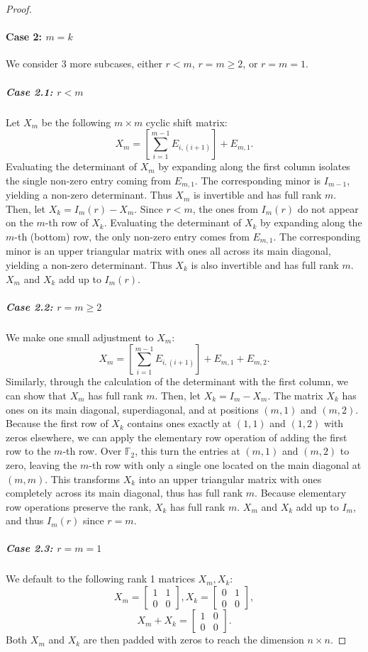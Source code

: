 \documentclass[12pt, a4paper]{amsart}
\theoremstyle{definition}
\numberwithin{equation}{section}
\newcommand{\F}{\mathbb{F}}
\newcommand{\tung}[1]{{\color{red}#1}}
\begin{document}
\begin{proof}
    \paragraph{Case 2: $m=k$}
    We consider 3 more subcases, either $r<m$, $r=m \geq 2$, or $r=m=1$.
    \subparagraph{Case 2.1: $r<m$}
    Let $X_m$ be the following $m\times m$ cyclic shift matrix:
    \[X_m = \left[ \sum_{i=1}^{m-1} E_{i,(i+1)} \right] + E_{m,1}.\]
    Evaluating the determinant of $X_m$ by expanding along the first column isolates the single non-zero entry coming from $E_{m,1}$. The corresponding minor is $I_{m-1}$, yielding a non-zero determinant. Thus $X_m$ is invertible and has full rank $m$. Then, let $X_k = I_m(r) - X_m$. Since $r<m$, the ones from $I_m(r)$ do not appear on the $m$-th row of $X_k$. Evaluating the determinant of $X_k$ by expanding along the $m$-th (bottom) row, the only non-zero entry comes from $E_{m,1}$. The corresponding minor is an upper triangular matrix with ones all across its main diagonal, yielding a non-zero determinant. Thus $X_k$ is also invertible and has full rank $m$. $X_m$ and $X_k$ add up to $I_m(r)$.
    \subparagraph{Case 2.2: $r=m \geq 2$}
    We make one small adjustment to $X_m$:
    \[X_m = \left[ \sum_{i=1}^{m-1} E_{i,(i+1)} \right] + E_{m,1} + E_{m,2}.\]
    Similarly, through the calculation of the determinant with the first column, we can show that $X_m$ has full rank $m$. Then, let $X_k = I_m - X_m$. The matrix $X_k$ has ones on its main diagonal, superdiagonal, and at positions $(m,1)$ and $(m,2)$. Because the first row of $X_k$ contains ones exactly at $(1,1)$ and $(1,2)$ with zeros elsewhere, we can apply the elementary row operation of adding the first row to the $m$-th row. Over $\F_2$, this turn the entries at $(m,1)$ and $(m,2)$ to zero, leaving the $m$-th row with only a single one located on the main diagonal at $(m,m)$. This transforms $X_k$ into an upper triangular matrix with ones completely across its main diagonal, thus has full rank $m$. Because elementary row operations preserve the rank, $X_k$ has full rank $m$. $X_m$ and $X_k$ add up to $I_m$, and thus $I_m(r)$ since $r=m$.
    \subparagraph{Case 2.3: $r=m=1$}
    We default to the following rank 1 matrices $X_m,X_k$:
    \[
    X_m = 
    \begin{bmatrix}
        1 & 1\\
        0 & 0
    \end{bmatrix},
    X_k =
    \begin{bmatrix}
        0 & 1\\
        0 & 0
    \end{bmatrix},
    \]
    \[
    X_m+X_k =
    \begin{bmatrix}
        1 & 0\\
        0 & 0
    \end{bmatrix}.
    \]
    Both $X_m$ and $X_k$ are then padded with zeros to reach the dimension $n\times n$.
\end{proof}
\end{document}

